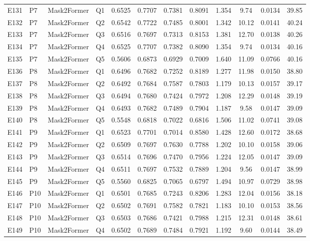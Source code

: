 \begin{longtable}{@{}lllllccccccc@{}}
E131 & P7 & Mask2Former & Q1 & 0.6525 & 0.7707 & 0.7381 & 0.8091 & 1.354 & 9.74 & 0.0134 & 39.85 \\
E132 & P7 & Mask2Former & Q2 & 0.6542 & 0.7722 & 0.7485 & 0.8001 & 1.342 & 10.12 & 0.0141 & 40.24 \\
E133 & P7 & Mask2Former & Q3 & 0.6516 & 0.7697 & 0.7313 & 0.8153 & 1.381 & 12.70 & 0.0138 & 40.26 \\
E134 & P7 & Mask2Former & Q4 & 0.6525 & 0.7707 & 0.7382 & 0.8090 & 1.354 & 9.74 & 0.0134 & 40.16 \\
E135 & P7 & Mask2Former & Q5 & 0.5606 & 0.6873 & 0.6929 & 0.7009 & 1.640 & 11.09 & 0.0766 & 40.16 \\
E136 & P8 & Mask2Former & Q1 & 0.6496 & 0.7682 & 0.7252 & 0.8189 & 1.277 & 11.98 & 0.0150 & 38.80 \\
E137 & P8 & Mask2Former & Q2 & 0.6492 & 0.7684 & 0.7587 & 0.7803 & 1.179 & 10.13 & 0.0157 & 39.17 \\
E138 & P8 & Mask2Former & Q3 & 0.6494 & 0.7680 & 0.7424 & 0.7972 & 1.208 & 12.29 & 0.0148 & 39.19 \\
E139 & P8 & Mask2Former & Q4 & 0.6493 & 0.7682 & 0.7489 & 0.7904 & 1.187 & 9.58 & 0.0147 & 39.09 \\
E140 & P8 & Mask2Former & Q5 & 0.5548 & 0.6818 & 0.7022 & 0.6816 & 1.506 & 11.02 & 0.0741 & 39.08 \\
E141 & P9 & Mask2Former & Q1 & 0.6523 & 0.7701 & 0.7014 & 0.8580 & 1.428 & 12.60 & 0.0172 & 38.68 \\
E142 & P9 & Mask2Former & Q2 & 0.6509 & 0.7697 & 0.7630 & 0.7788 & 1.202 & 10.10 & 0.0158 & 39.06 \\
E143 & P9 & Mask2Former & Q3 & 0.6514 & 0.7696 & 0.7470 & 0.7956 & 1.224 & 12.05 & 0.0147 & 39.09 \\
E144 & P9 & Mask2Former & Q4 & 0.6511 & 0.7697 & 0.7532 & 0.7889 & 1.204 & 9.56 & 0.0147 & 38.99 \\
E145 & P9 & Mask2Former & Q5 & 0.5560 & 0.6825 & 0.7065 & 0.6797 & 1.494 & 10.97 & 0.0729 & 38.98 \\
E146 & P10 & Mask2Former & Q1 & 0.6501 & 0.7685 & 0.7243 & 0.8206 & 1.283 & 12.04 & 0.0156 & 38.18 \\
E147 & P10 & Mask2Former & Q2 & 0.6502 & 0.7691 & 0.7582 & 0.7821 & 1.183 & 10.10 & 0.0153 & 38.56 \\
E148 & P10 & Mask2Former & Q3 & 0.6503 & 0.7686 & 0.7421 & 0.7988 & 1.215 & 12.31 & 0.0148 & 38.61 \\
E149 & P10 & Mask2Former & Q4 & 0.6502 & 0.7689 & 0.7484 & 0.7921 & 1.192 & 9.60 & 0.0144 & 38.49 \\

\end{longtable}
